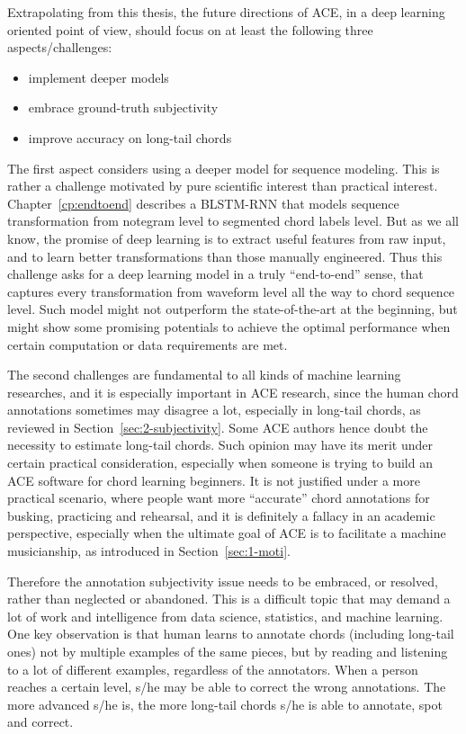 
Extrapolating from this thesis, the future directions of ACE, in a deep learning oriented point of view, should focus on at least the following three aspects/challenges:
\begin{itemize}
\item implement deeper models
\item embrace ground-truth subjectivity
\item improve accuracy on long-tail chords
\end{itemize}

The first aspect considers using a deeper model for sequence modeling. This is rather a challenge motivated by pure scientific interest than practical interest. Chapter~\ref{cp:endtoend} describes a BLSTM-RNN that models sequence transformation from notegram level to segmented chord labels level. But as we all know, the promise of deep learning is to extract useful features from raw input, and to learn better transformations than those manually engineered. Thus this challenge asks for a deep learning model in a truly ``end-to-end'' sense, that captures every transformation from waveform level all the way to chord sequence level. Such model might not outperform the state-of-the-art at the beginning, but might show some promising potentials to achieve the optimal performance when certain computation or data requirements are met.

The second challenges are fundamental to all kinds of machine learning researches, and it is especially important in ACE research, since the human chord annotations sometimes may disagree a lot, especially in long-tail chords, as reviewed in Section~\ref{sec:2-subjectivity}. Some ACE authors hence doubt the necessity to estimate long-tail chords. Such opinion may have its merit under certain practical consideration, especially when someone is trying to build an ACE software for chord learning beginners. It is not justified under a more practical scenario, where people want more ``accurate'' chord annotations for busking, practicing and rehearsal, and it is definitely a fallacy in an academic perspective, especially when the ultimate goal of ACE is to facilitate a machine musicianship, as introduced in Section~\ref{sec:1-moti}.

Therefore the annotation subjectivity issue needs to be embraced, or resolved, rather than neglected or abandoned. This is a difficult topic that may demand a lot of work and intelligence from data science, statistics, and machine learning. One key observation is that human learns to annotate chords (including long-tail ones) not by multiple examples of the same pieces, but by reading and listening to a lot of different examples, regardless of the annotators. When a person reaches a certain level, s/he may be able to correct the wrong annotations. The more advanced s/he is, the more long-tail chords s/he is able to annotate, spot and correct.

